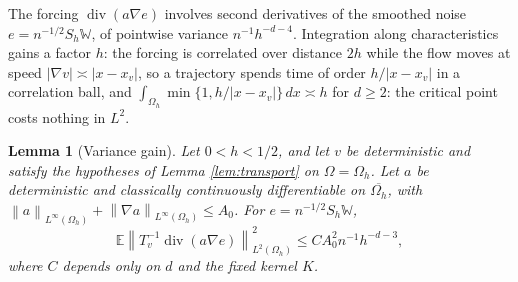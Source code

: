 \documentclass[12pt]{article}
\numberwithin{equation}{section}
\newtheorem{lemma}[theorem]{Lemma}
\newcommand{\E}{\mathbb E}
\newcommand{\norm}[1]{\left\|#1\right\|}
\newcommand{\diver}{\operatorname{div}}
\begin{document}
The forcing $\diver(a\nabla e)$ involves second derivatives of the
smoothed noise $e=n^{-1/2}S_h\mathbb W$, of pointwise variance
$n^{-1}h^{-d-4}$. Integration along characteristics gains a factor
$h$: the forcing is correlated over distance $2h$ while the flow moves
at speed $|\nabla v|\asymp|x-x_v|$, so a trajectory spends time of
order $h/|x-x_v|$ in a correlation ball, and
$\int_{\Omega_h}\min\{1,h/|x-x_v|\}\,dx\asymp h$ for $d\ge2$: the
critical point costs nothing in $L^2$.

\begin{lemma}[Variance gain]\label{lem:variance}
Let $0<h<1/2$, and let $v$ be deterministic and satisfy the
hypotheses of Lemma \ref{lem:transport} on $\Omega=\Omega_h$.
Let $a$ be deterministic and classically continuously differentiable
on $\overline{\Omega_h}$, with
$\norm a_{L^\infty(\Omega_h)}+\norm{\nabla a}_{L^\infty(\Omega_h)}\le A_0$.
For $e=n^{-1/2}S_h\mathbb W$,
\begin{equation}\label{eq:sharpvariance}
 \E\norm{T_v^{-1}\diver(a\nabla e)}_{L^2(\Omega_h)}^2
 \le C A_0^2 n^{-1}h^{-d-3},
\end{equation}
where $C$ depends only on $d$ and the fixed kernel $K$.
\end{lemma}
\end{document}
